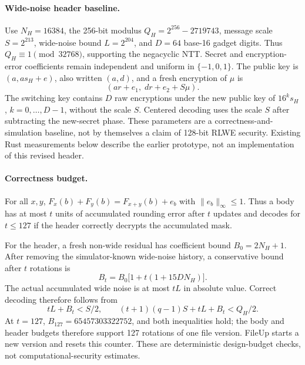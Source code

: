 \paragraph{Wide-noise header baseline.}
Use $N_H=16384$, the 256-bit modulus $Q_H=2^{256}-2719743$, message scale $S=2^{213}$, wide-noise bound $L=2^{204}$, and $D=64$ base-16 gadget digits. Thus $Q_H\equiv1\pmod{32768}$, supporting the negacyclic NTT. Secret and encryption-error coefficients remain independent and uniform in $\{-1,0,1\}$. The public key is $(a,as_H+e)$, also written $(a,d)$, and a fresh encryption of $\mu$ is
\[
 (ar+e_1,\;dr+e_2+S\mu).
\]
The switching key contains $D$ raw encryptions under the new public key of $16^k s_H$, $k=0,\ldots,D-1$, without the scale $S$. Centered decoding uses the scale $S$ after subtracting the new-secret phase. These parameters are a correctness-and-simulation baseline, not by themselves a claim of 128-bit RLWE security. Existing Rust measurements below describe the earlier prototype, not an implementation of this revised header.

\paragraph{Correctness budget.}
For all $x,y$, $F_x(b)+F_y(b)=F_{x+y}(b)+e_b$ with $\|e_b\|_\infty\le1$. Thus a body has at most $t$ units of accumulated rounding error after $t$ updates and decodes for $t\le127$ if the header correctly decrypts the accumulated mask.

For the header, a fresh non-wide residual has coefficient bound $B_0=2N_H+1$. After removing the simulator-known wide-noise history, a conservative bound after $t$ rotations is
\[
 B_t=B_0\bigl[1+t(1+15DN_H)\bigr].
\]
The actual accumulated wide noise is at most $tL$ in absolute value. Correct decoding therefore follows from
\[
 tL+B_t<S/2,\qquad
 (t+1)(q-1)S+tL+B_t<Q_H/2.
\]
At $t=127$, $B_{127}=65457303322752$, and both inequalities hold; the body and header budgets therefore support 127 rotations of one file version. FileUp starts a new version and resets this counter. These are deterministic design-budget checks, not computational-security estimates.


